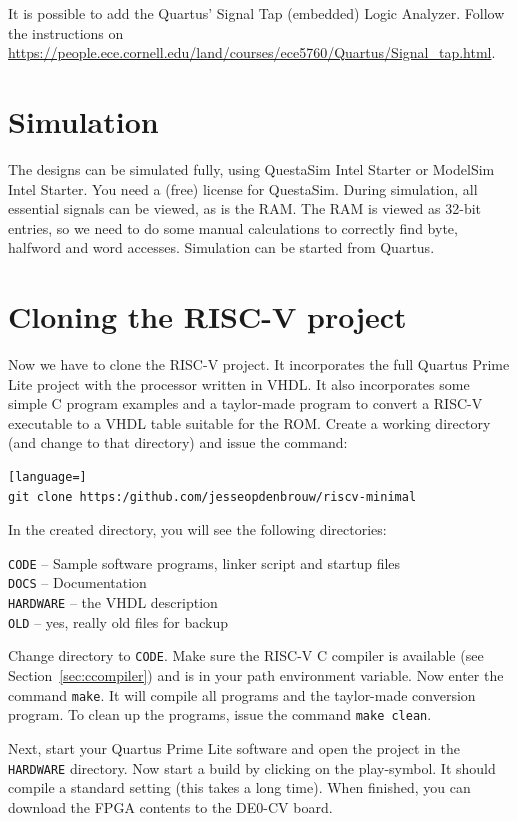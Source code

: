 \documentclass[12pt]{article}
\begin{document}
It is possible to add the Quartus' Signal Tap (embedded) Logic Analyzer. Follow the instructions on \url{https://people.ece.cornell.edu/land/courses/ece5760/Quartus/Signal_tap.html}.

\section{Simulation}
The designs can be simulated fully, using QuestaSim Intel Starter or ModelSim Intel Starter. You need a (free) license for QuestaSim. During simulation, all essential signals can be viewed, as is the RAM. The RAM is viewed as 32-bit entries, so we need to do some manual calculations to correctly find byte, halfword and word accesses. Simulation can be started from Quartus.

\section{Cloning the RISC-V project}
\label{sec:cloning}
Now we have to clone the RISC-V project. It incorporates the full Quartus Prime Lite project with the processor written in VHDL. It also incorporates some simple C program examples and a taylor-made program to convert a RISC-V executable to a VHDL table suitable for the ROM. Create a working directory (and change to that directory) and issue the command:

\begin{lstlisting}[language=]
git clone https:/github.com/jesseopdenbrouw/riscv-minimal
\end{lstlisting}

In the created directory, you will see the following directories:

\texttt{CODE} -- Sample software programs, linker script and startup files\\
\texttt{DOCS} -- Documentation\\
\texttt{HARDWARE} -- the VHDL description \\
\texttt{OLD} -- yes, really old files for backup

Change directory to \texttt{CODE}. Make sure the RISC-V C compiler is available (see Section~\ref{sec:ccompiler}) and is in your path environment variable. Now enter the command \texttt{make}. It will compile all programs and the taylor-made conversion program. To clean up the programs, issue the command \texttt{make clean}.

Next, start your Quartus Prime Lite software and open the project in the \texttt{HARDWARE} directory. Now start a build by clicking on the play-symbol. It should compile a standard setting (this takes a long time). When finished, you can download the FPGA contents to the DE0-CV board.
\end{document}
